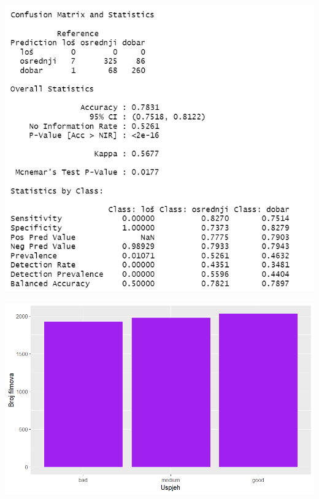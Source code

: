 

\begin{center}
	\includegraphics{../figures/expl/003.png}
\end{center}



\begin{center}
	\includegraphics[width=15cm]{../figures/expl/004.png}
\end{center}

